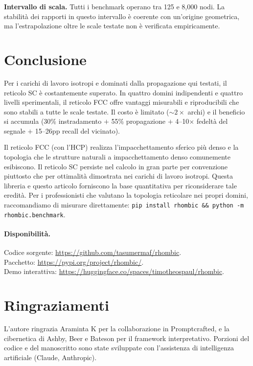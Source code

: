 \documentclass[11pt]{article}
\begin{document}
\textbf{Intervallo di scala.} Tutti i benchmark operano tra 125 e 8{,}000
nodi. La stabilit\`a dei rapporti in questo intervallo \`e coerente con
un'origine geometrica, ma l'estrapolazione oltre le scale testate non \`e
verificata empiricamente.

\section{Conclusione}
\label{sec:conclusion}

Per i carichi di lavoro isotropi e dominati dalla propagazione qui
testati, il reticolo SC \`e costantemente superato. In quattro domini
indipendenti e quattro livelli sperimentali, il reticolo FCC offre
vantaggi misurabili e riproducibili che sono stabili a tutte le scale
testate. Il costo \`e limitato (${\sim}2\times$ archi) e il beneficio si
accumula (30\% instradamento $+$ 55\% propagazione $+$ 4--10$\times$
fedelt\`a del segnale $+$ 15--26pp recall del vicinato).

Il reticolo FCC (con l'HCP) realizza l'impacchettamento sferico pi\`u
denso e la topologia che le strutture naturali a impacchettamento denso
comunemente esibiscono. Il reticolo SC persiste nel calcolo in gran parte
per convenzione piuttosto che per ottimalit\`a dimostrata nei carichi di
lavoro isotropi. Questa libreria e questo articolo forniscono la base
quantitativa per riconsiderare tale eredit\`a. Per i professionisti che
valutano la topologia reticolare nei propri domini, raccomandiamo di
misurare direttamente:
\texttt{pip install rhombic \&\& python -m rhombic.benchmark}.

\paragraph{Disponibilit\`a.}
Codice sorgente: \url{https://github.com/tasumermaf/rhombic}.\\
Pacchetto: \url{https://pypi.org/project/rhombic/}.\\
Demo interattiva: \url{https://huggingface.co/spaces/timotheospaul/rhombic}.

\section*{Ringraziamenti}

L'autore ringrazia Araminta K per la collaborazione in Promptcrafted, e
la cibernetica di Ashby, Beer e Bateson per il framework interpretativo.
Porzioni del codice e del manoscritto sono state sviluppate con
l'assistenza di intelligenza artificiale (Claude, Anthropic).



\end{document}
